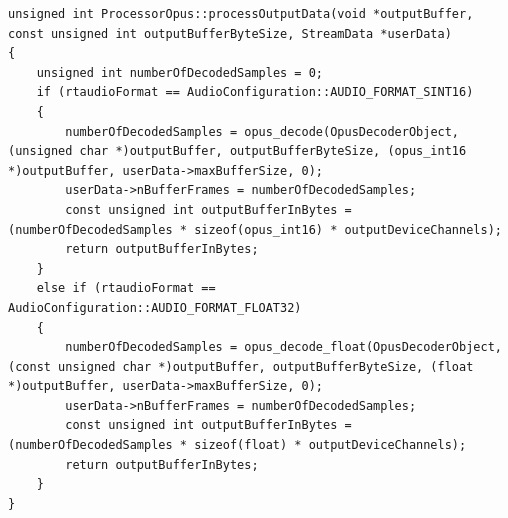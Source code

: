\begin{lstlisting}[caption={Decodieren von Audio Daten mittels Opus},label={Code:Opus Decodieren}]
unsigned int ProcessorOpus::processOutputData(void *outputBuffer, const unsigned int outputBufferByteSize, StreamData *userData)
{
    unsigned int numberOfDecodedSamples = 0;
    if (rtaudioFormat == AudioConfiguration::AUDIO_FORMAT_SINT16)
    {
        numberOfDecodedSamples = opus_decode(OpusDecoderObject, (unsigned char *)outputBuffer, outputBufferByteSize, (opus_int16 *)outputBuffer, userData->maxBufferSize, 0);
        userData->nBufferFrames = numberOfDecodedSamples;
        const unsigned int outputBufferInBytes = (numberOfDecodedSamples * sizeof(opus_int16) * outputDeviceChannels);
        return outputBufferInBytes;
    }
    else if (rtaudioFormat == AudioConfiguration::AUDIO_FORMAT_FLOAT32)
    {
        numberOfDecodedSamples = opus_decode_float(OpusDecoderObject, (const unsigned char *)outputBuffer, outputBufferByteSize, (float *)outputBuffer, userData->maxBufferSize, 0);
        userData->nBufferFrames = numberOfDecodedSamples;
        const unsigned int outputBufferInBytes = (numberOfDecodedSamples * sizeof(float) * outputDeviceChannels);
        return outputBufferInBytes;
    }
}
\end{lstlisting}

\FloatBarrier
